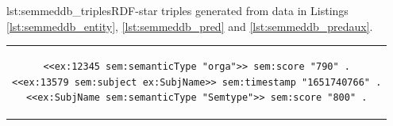 \noindent\hspace{0.1\linewidth}\begin{minipage}{0.78\linewidth}
\begin{captionedlisting}{lst:semmeddb_triples}{RDF-star triples generated from data in Listings \ref{lst:semmeddb_entity}, \ref{lst:semmeddb_pred} and \ref{lst:semmeddb_predaux}.}
\centering
\begin{tabular}{c}
\hspace{-1.5em}
{
\begin{lstlisting}[basicstyle=\ttfamily\small,label={list:example1},columns=flexible]
<<ex:12345 sem:semanticType "orga">> sem:score "790" .
<<ex:13579 sem:subject ex:SubjName>> sem:timestamp "1651740766" .
<<ex:SubjName sem:semanticType "Semtype">> sem:score "800" .
\end{lstlisting}
}
\end{tabular}
\end{captionedlisting}
\end{minipage}
